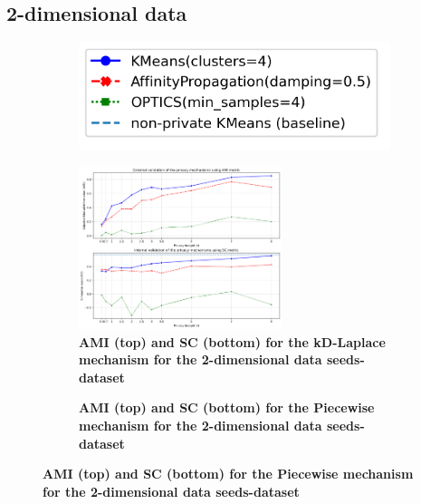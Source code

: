 \subsection{2-dimensional data}
\begin{figure}[H]
    \centering
    \begin{subfigure}{0.3\textwidth}
        \includegraphics[width=\textwidth]{Results/2d-laplace/seeds-dataset/legend.png}
    \end{subfigure}
    \begin{subfigure}{1\textwidth}
        \centering
        \includegraphics[width=0.65\textwidth]{Results/kd-laplace/kd-Laplace/seeds-dataset/ami-and-sc_2_dimensions.png}
        \centering
        \caption{\textbf{AMI (top) and SC (bottom) for the kD-Laplace mechanism for the 2-dimensional data seeds-dataset}}
    \end{subfigure}
    \begin{subfigure}{1\textwidth}
        \centering
        \caption{\textbf{AMI (top) and SC (bottom) for the Piecewise mechanism for the 2-dimensional data seeds-dataset}}
    \end{subfigure}
    \label{fig:validation-seeds-dataset_comparison_2d-laplace}
\end{figure}
